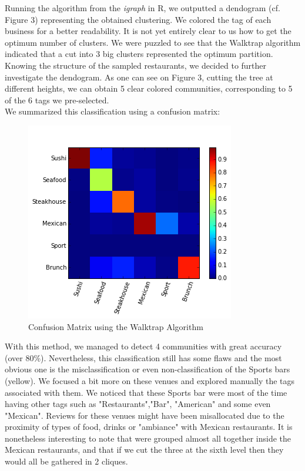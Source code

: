 \documentclass[twoside]{article}
\begin{document}
\begin{multicols}{2}
Running the algorithm from the \emph{igraph} in R, we outputted a dendogram (cf. Figure 3) representing the obtained clustering. We colored the tag of each business for a better readability.  It is not yet entirely clear to us how to get the optimum number of clusters. We were puzzled to see that the Walktrap algorithm indicated that a cut into 3 big clusters represented the optimum partition. Knowing the structure of the sampled restaurants, we decided to further investigate the dendogram. As one can see on Figure 3, cutting the tree at different heights, we can obtain 5 clear colored communities, corresponding to 5 of the 6 tags we pre-selected.\\

\noindent We summarized this classification using a confusion matrix: 
\begin{figure}[H]
\centering
\includegraphics[width=1\linewidth]{confusion}
\caption{Confusion Matrix using the Walktrap Algorithm}
\end{figure}

\noindent With this method, we managed to detect 4 communities with great accuracy (over 80\%). Nevertheless, this classification still has some flaws and the most obvious one is the misclassification or even non-classification of the Sports bars (yellow). We focused a bit more on these venues and explored manually the tags associated with them. We noticed that these Sports bar were most of the time having other tags such as "Restaurants","Bar", "American" and some even "Mexican". Reviews for these venues might have been misallocated due to the proximity of types of food, drinks or "ambiance" with Mexican restaurants. It is nonetheless interesting to note that were grouped almost all together inside the Mexican restaurants, and that if we cut the three at the sixth level then they would all be gathered in 2 cliques.\\


\end{multicols}
\end{document}
